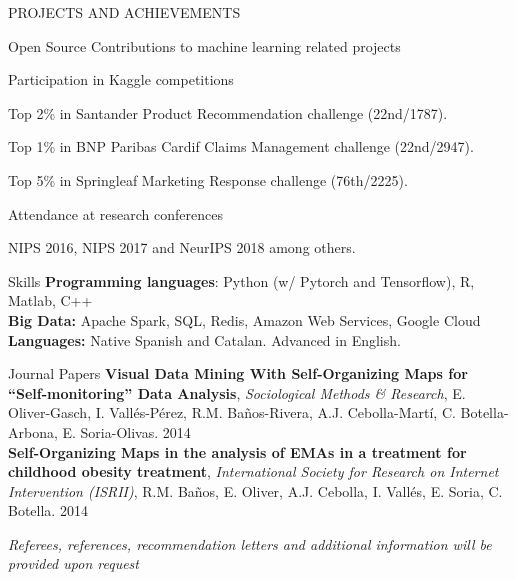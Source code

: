 \documentclass{resume} %
\begin{document}
\begin{rSection}{PROJECTS AND ACHIEVEMENTS}
\begin{rSubsection}{Open Source Contributions to machine learning related projects}
\end{rSubsection}

\vspace{-6pt}

\begin{rSubsection}{Participation in Kaggle competitions}
{}{}{}  

\vspace{-3pt}

\item Top 2\% in Santander Product Recommendation challenge (22nd/1787).
\item Top 1\% in BNP Paribas Cardif Claims Management challenge (22nd/2947).
\item Top 5\% in Springleaf Marketing Response challenge (76th/2225).

\end{rSubsection}

\vspace{-6pt}

\begin{rSubsection}{Attendance at research conferences}{}{}{}  

\vspace{-3pt}

 \item NIPS 2016, NIPS 2017 and NeurIPS 2018 among others.

\end{rSubsection}

\end{rSection} 

\begin{rSection}{Skills} \itemsep -3pt  
{\textbf{Programming languages}: Python (w/ Pytorch and Tensorflow), R, Matlab, C++ }  \\
{\textbf{Big Data:} Apache Spark, SQL, Redis, Amazon Web Services, Google Cloud } \\
{\textbf{Languages:} Native Spanish and Catalan. Advanced in English.}
\end{rSection}  
 
\vspace{\fill}




\begin{rSection}{Journal Papers}
{\textbf{Visual Data Mining With Self-Organizing Maps for ``Self-monitoring'' Data Analysis}, \textit{Sociological Methods \& Research}, E. Oliver-Gasch, I. Vallés-Pérez, R.M. Baños-Rivera, A.J. Cebolla-Martí, C. Botella-Arbona, E. Soria-Olivas. \hfill {2014}}\\
{\textbf{Self-Organizing Maps in the analysis of EMAs in a treatment for childhood obesity treatment}, \textit{International Society for Research on Internet Intervention (ISRII)}, R.M. Baños, E. Oliver, A.J. Cebolla, I. Vallés, E. Soria, C. Botella.  \hfill {2014}}

\end{rSection}


\begin{flushright}
	\small{\textit{Referees, references, recommendation letters and additional information will be provided upon request}}
\end{flushright}
\end{document}
